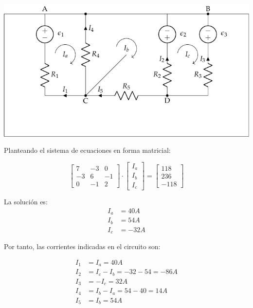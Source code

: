\begin{center}
  \includegraphics{figuras/mallas_condensadores_sol.pdf}
\end{center}

Planteando el sistema de ecuaciones en forma matricial:

\begin{equation*}
  \begin{bmatrix}
    7 & -3 & 0\\
    -3 & 6 & -1\\
    0 & -1 & 2
  \end{bmatrix}
  \cdot
  \begin{bmatrix}
    I_a\\
    I_b\\
    I_c
  \end{bmatrix}
  =
  \begin{bmatrix}
    118\\
    236\\
    -118
  \end{bmatrix}
\end{equation*}

La solución es:
\begin{align*}
  I_a & =  {40}A\\
  I_b & =  {54}A\\
  I_c & =  -{32}A
\end{align*}

Por tanto, las corrientes indicadas en el circuito son:

\begin{align*}
  I_1 &= I_a =  {40}A\\
  I_2  &= I_c-I_b =-32-54= {-86}A\\
  I_3  &= -I_c=  {32}A\\
  I_4& = I_b-I_a = 54-40=  {14}A\\
  I_5 &= I_b=  {54}A
\end{align*}


